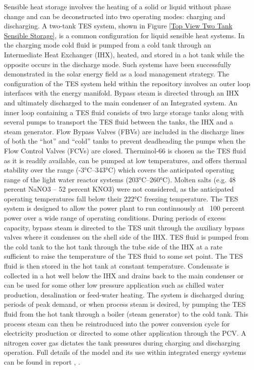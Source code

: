 Sensible heat storage involves the heating of a solid or liquid without phase change and can be deconstructed into two operating modes: charging and discharging. A two-tank TES system, shown in Figure \ref{Top View Two Tank Sensible Storage}, is a common configuration for liquid sensible heat systems. In the charging mode cold fluid is pumped from a cold tank through an Intermediate Heat Exchanger (IHX), heated, and stored in a hot tank while the opposite occurs in the discharge mode. Such systems have been successfully demonstrated in the solar energy field as a load management strategy. The configuration of the TES system held within the repository involves an outer loop interfaces with the energy manifold. Bypass steam is directed through an IHX and ultimately discharged to the main condenser of an Integrated system. An inner loop containing a TES fluid consists of two large storage tanks along with several pumps to transport the TES fluid between the tanks, the IHX and a steam generator. Flow Bypass Valves (FBVs) are included in the discharge lines of both the “hot” and “cold” tanks to prevent deadheading the pumps when the Flow Control Valves (FCVs) are closed. Therminol-66 is chosen as the TES fluid as it is readily available, can be pumped at low temperatures, and offers thermal stability over the range (-3°C–343°C) which covers the anticipated operating range of the light water reactor systems (203°C–260°C). Molten salts (e.g. 48 percent  NaNO3 – 52 percent KNO3) were not considered, as the anticipated operating temperatures fall below their 222°C freezing temperature. The TES system is designed to allow the power plant to run continuously at ~100 percent power over a wide range of operating conditions. During periods of excess capacity, bypass steam is directed to the TES unit through the auxiliary bypass valves where it condenses on the shell side of the IHX. TES fluid is pumped from the cold tank to the hot tank through the tube side of the IHX at a rate sufficient to raise the temperature of the TES fluid to some set point. The TES fluid is then stored in the hot tank at constant temperature. Condensate is collected in a hot well below the IHX and drains back to the main condenser or can be used for some other low pressure application such as chilled water production, desalination or feed-water heating. The system is discharged during periods of peak demand, or when process steam is desired, by pumping the TES fluid from the hot tank through a boiler (steam generator) to the cold tank. This process steam can then be reintroduced into the power conversion cycle for electricity production or directed to some other application through the PCV. A nitrogen cover gas dictates the tank pressures during charging and discharging operation. Full details of the model and its use within integrated energy systems can be found in report \cite{2018ThermalStorage}, \cite{FrickThermalStorage}. 

